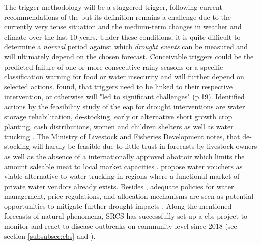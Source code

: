 The trigger methodology will be a staggered trigger, following current recommendations of the \textcite{rcrcFORECASTBASEDFINANCINGEARLY2020} but its definition remains a challenge due to the currently very tense situation and the medium-term changes in weather and climate over the last 10 years. Under these conditions, it is quite difficult to determine a \textit{normal} period against which \textit{drought events} can be measured and will ultimately depend on the chosen forecast. Conceivable triggers could be the predicted failure of one or more consecutive rainy seasons or a specific classification warning for food or water insecurity and will further depend on selected actions. \Textcite{gettliffeOCHAAnticipatoryAction2021} found, that triggers need to be linked to their respective intervention, or otherwise will "led to significant challenges" (p.19).\newline
Identified actions by the feasibility study of the \acrshort{eap} for drought interventions are water storage rehabilitation, de-stocking, early or alternative short growth crop planting, cash distributions, women and children shelters as well as water trucking \autocite{scrsFeasibilityStudyPotential2022}. The Ministry of Livestock and Fisheries Development notes, that de-stocking will hardly be feasible due to little trust in forecasts by livestock owners as well as the absence of a internationally approved abattoir which limits the amount saleable meat to local market capacities \autocite{scrsFeasibilityStudyPotential2022}. \Textcite{gualazziniEWEAEarlyWarning2021} propose water vouchers as viable alternative to water trucking in regions where a functional market of private water vendors already exists. Besides , adequate policies for water management, price regulations, and allocation mechanisms are seen as potential opportunities to mitigate further drought impacts \autocite{gualazziniEWEAEarlyWarning2021,wangPropagationDroughtMeteorological2016}.\newline
Along the mentioned forecasts of natural phenomena, SRCS has successfully set up a \acrshort{cbs} project to monitor and react to disease outbreaks on community level since 2018 (see section \ref{subsubsec:cbs} and \textcite{jungCommunityBasedSurveillance2022}). 

